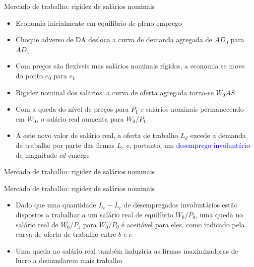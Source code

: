 \documentclass[10pt]{beamer}
\begin{document}
\begin{frame}{Mercado de trabalho: rigidez de salários nominais}
    \begin{itemize}
        \item Economia inicialmente em equilíbrio de pleno emprego
        \bigskip
        \item Choque adverso de DA desloca a curva de demanda agregada de $AD_0$ para $AD_1$
        \bigskip
        \item Com preços são flexíveis mas salários nominais rígidos, a economia se move do ponto $e_0$ para $e_1$
        \bigskip
        \item Rigidez nominal dos salários: a curva de oferta agregada torna-se $W_0AS$
        \bigskip
        \item Com a queda do nível de preços para $P_1$ e salários nominais permanecendo em $W_0$, o salário real aumenta para $W_0/P_1$
        \bigskip
        \item A este novo valor de salário real, a oferta de trabalho $L_d$ excede a demanda de trabalho por parte das firmas $L_c$ e, portanto, um \textcolor{blue}{desemprego involuntário} de magnitude $cd$ emerge
    \end{itemize}
\end{frame}

\begin{frame}{Mercado de trabalho: rigidez de salários nominais}
\end{frame}

\begin{frame}{Mercado de trabalho: rigidez de salários nominais}
    \begin{itemize}
        \item Dado que uma quantidade $L_e - L_c$ de desempregados involuntários estão dispostos a trabalhar a um salário real de equilíbrio $W_0/P_0$, uma queda no salário real de $W_0/P_1$ para $W_0/P_0$ é aceitável para eles, como indicado pela curva de oferta de trabalho entre $b$ e $e$
        \bigskip
        \item Uma queda no salário real também induziria as firmas maximizadoras de lucro a demandarem mais trabalho
    \end{itemize}
\end{frame}
\end{document}
